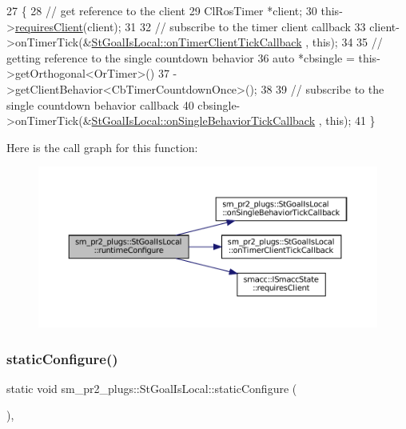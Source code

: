 \begin{DoxyCode}
27     \{
28         \textcolor{comment}{// get reference to the client}
29         ClRosTimer *client;
30         this->\hyperlink{classsmacc_1_1ISmaccState_a7f95c9f0a6ea2d6f18d1aec0519de4ac}{requiresClient}(client);
31 
32         \textcolor{comment}{// subscribe to the timer client callback}
33         client->onTimerTick(&\hyperlink{structsm__pr2__plugs_1_1StGoalIsLocal_a3a851e3468f6b247139f16abd1b91af3}{StGoalIsLocal::onTimerClientTickCallback}
      , \textcolor{keyword}{this});
34 
35         \textcolor{comment}{// getting reference to the single countdown behavior}
36         \textcolor{keyword}{auto} *cbsingle = this->getOrthogonal<OrTimer>()
37                              ->getClientBehavior<CbTimerCountdownOnce>();
38 
39         \textcolor{comment}{// subscribe to the single countdown behavior callback}
40         cbsingle->onTimerTick(&\hyperlink{structsm__pr2__plugs_1_1StGoalIsLocal_a4d5abf255b17a81fe4a758a07f502e7d}{StGoalIsLocal::onSingleBehaviorTickCallback}
      , \textcolor{keyword}{this});
41     \}
\end{DoxyCode}
Here is the call graph for this function\+:
\nopagebreak
\begin{figure}[H]
\begin{center}
\leavevmode
\includegraphics[width=350pt]{structsm__pr2__plugs_1_1StGoalIsLocal_aeddacc72a9eefe2a51d24564874f1610_cgraph}
\end{center}
\end{figure}
\mbox{\label{structsm__pr2__plugs_1_1StGoalIsLocal_a7fde75ffa3d95e2f5153c35596817ab4}} 
\subsubsection{\texorpdfstring{static\+Configure()}{staticConfigure()}}
{\footnotesize\ttfamily static void sm\+\_\+pr2\+\_\+plugs\+::\+St\+Goal\+Is\+Local\+::static\+Configure (\begin{DoxyParamCaption}{ }\end{DoxyParamCaption})\hspace{0.3cm}{\ttfamily [inline]}, {\ttfamily [static]}}



